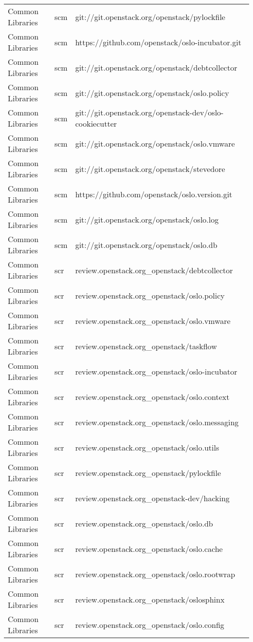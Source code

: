 \begin{center}
\begin{longtable}{|p{4cm}|p{1cm}|p{10cm}|}
Common Libraries&scm&git://git.openstack.org/openstack/pylockfile\\
Common Libraries&scm&https://github.com/openstack/oslo-incubator.git\\
Common Libraries&scm&git://git.openstack.org/openstack/debtcollector\\
Common Libraries&scm&git://git.openstack.org/openstack/oslo.policy\\
Common Libraries&scm&git://git.openstack.org/openstack-dev/oslo-cookiecutter\\
Common Libraries&scm&git://git.openstack.org/openstack/oslo.vmware\\
Common Libraries&scm&git://git.openstack.org/openstack/stevedore\\
Common Libraries&scm&https://github.com/openstack/oslo.version.git\\
Common Libraries&scm&git://git.openstack.org/openstack/oslo.log\\
Common Libraries&scm&git://git.openstack.org/openstack/oslo.db\\
Common Libraries&scr&review.openstack.org\_openstack/debtcollector\\
Common Libraries&scr&review.openstack.org\_openstack/oslo.policy\\
Common Libraries&scr&review.openstack.org\_openstack/oslo.vmware\\
Common Libraries&scr&review.openstack.org\_openstack/taskflow\\
Common Libraries&scr&review.openstack.org\_openstack/oslo-incubator\\
Common Libraries&scr&review.openstack.org\_openstack/oslo.context\\
Common Libraries&scr&review.openstack.org\_openstack/oslo.messaging\\
Common Libraries&scr&review.openstack.org\_openstack/oslo.utils\\
Common Libraries&scr&review.openstack.org\_openstack/pylockfile\\
Common Libraries&scr&review.openstack.org\_openstack-dev/hacking\\
Common Libraries&scr&review.openstack.org\_openstack/oslo.db\\
Common Libraries&scr&review.openstack.org\_openstack/oslo.cache\\
Common Libraries&scr&review.openstack.org\_openstack/oslo.rootwrap\\
Common Libraries&scr&review.openstack.org\_openstack/oslosphinx\\
Common Libraries&scr&review.openstack.org\_openstack/oslo.config\\

\end{longtable}
\end{center}
